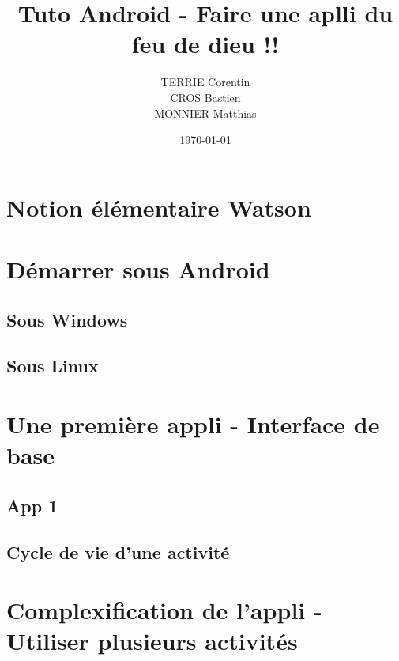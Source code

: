 \documentclass[a4paper,10pt]{article}
\title{Tuto Android - Faire une aplli du feu de dieu !!}
\author{TERRIE Corentin \\ CROS Bastien \\ MONNIER Matthias}
\date{\today}
\begin{document}

\tableofcontents
\clearpage



\section{Notion élémentaire Watson} %



\section{Démarrer sous Android}

\subsection{Sous Windows}

\subsection{Sous Linux}


\section{Une première appli - Interface de base}

\subsection{App 1}
\subsection{Cycle de vie d'une activité}


\section{Complexification de l'appli - Utiliser plusieurs activités}
\end{document}
